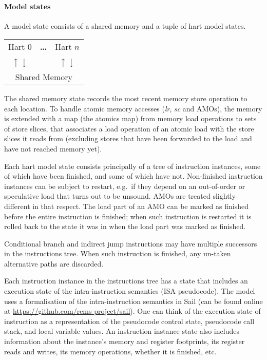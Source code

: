 \paragraph{Model states}
A model state consists of a shared memory and a tuple of hart model states.
\begin{center}
\sffamily
\begin{tabular}{ccc}
\cline{1-1}\cline{3-3}
\multicolumn{1}{|c|}{Hart 0} & \bf \dots & \multicolumn{1}{|c|}{Hart $n$} \\
\cline{1-1}\cline{3-3}
$\big\uparrow$ $\big\downarrow$ & & $\big\uparrow$ $\big\downarrow$ \\
\hline
\multicolumn{3}{|c|}{Shared Memory} \\
\hline
\end{tabular}
\end{center}
The shared memory state records the most recent memory store operation to each location.
To handle atomic memory accesses ({\em  lr}, {\em sc} and AMOs), the memory is extended with a map (the atomics map) from memory load operations to sets of store slices, that associates a load operation of an atomic load with the store slices it reads from (excluding stores that have been forwarded to the load and have not reached memory yet).

Each hart model state consists principally of a tree of instruction instances, some of which have been finished, and some of which have not.
Non-finished instruction instances can be subject to restart, e.g.~if they depend on an out-of-order or speculative load that turns out to be unsound.
AMOs are treated slightly different in that respect.
The load part of an AMO can be marked as finished before the entire instruction is finished; when such instruction is restarted it is rolled back to the state it was in when the load part was marked as finished.

Conditional branch and indirect jump instructions may have multiple successors in the instructions tree.
When such instruction is finished, any un-taken alternative paths are discarded.

Each instruction instance in the instructions tree has a state that includes an execution state of the intra-instruction semantics (ISA pseudocode).
The model uses a formalisation of the intra-instruction semantics in Sail (can be found online at \url{https://github.com/rems-project/sail}).
One can think of the execution state of instruction as a representation of the pseudocode control state, pseudocode call stack, and local variable values.
An instruction instance state also includes information about the instance's memory and register footprints, its register reads and writes, its memory operations, whether it is finished, etc.

